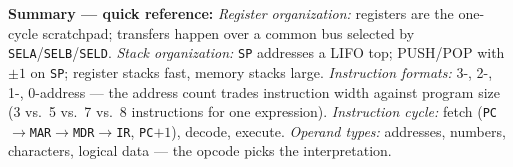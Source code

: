 \documentclass[11pt]{article}
\begin{document}
\textbf{Summary --- quick reference:} \emph{Register organization:} registers are the one-cycle scratchpad; transfers happen over a common bus selected by \texttt{SELA}/\texttt{SELB}/\texttt{SELD}. \emph{Stack organization:} \texttt{SP} addresses a LIFO top; PUSH/POP with $\pm 1$ on \texttt{SP}; register stacks fast, memory stacks large. \emph{Instruction formats:} 3-, 2-, 1-, 0-address --- the address count trades instruction width against program size (3 vs.\ 5 vs.\ 7 vs.\ 8 instructions for one expression). \emph{Instruction cycle:} fetch (\texttt{PC}$\to$\texttt{MAR}$\to$\texttt{MDR}$\to$\texttt{IR}, \texttt{PC}${+}1$), decode, execute. \emph{Operand types:} addresses, numbers, characters, logical data --- the opcode picks the interpretation.
\end{document}

